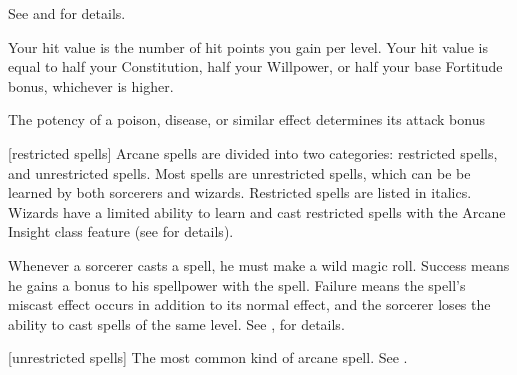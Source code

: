 See  and  for details.

 Your hit value is the number of hit points you gain per level. Your hit value is equal to half your Constitution, half your Willpower, or half your base Fortitude bonus, whichever is higher.

 The potency of a poison, disease, or similar effect determines its attack bonus

[restricted spells] Arcane spells are divided into two categories: restricted spells, and unrestricted spells. Most spells are unrestricted spells, which can be be learned by both sorcerers and wizards. Restricted spells are listed in italics. Wizards have a limited ability to learn and cast restricted spells with the Arcane Insight class feature (see  for details).

 Whenever a sorcerer casts a spell, he must make a wild magic roll.
Success means he gains a bonus to his spellpower with the spell.
Failure means the spell's miscast effect occurs in addition to its normal effect, and the sorcerer loses the ability to cast spells of the same level.
See , for details.

[unrestricted spells] The most common kind of arcane spell. See .
